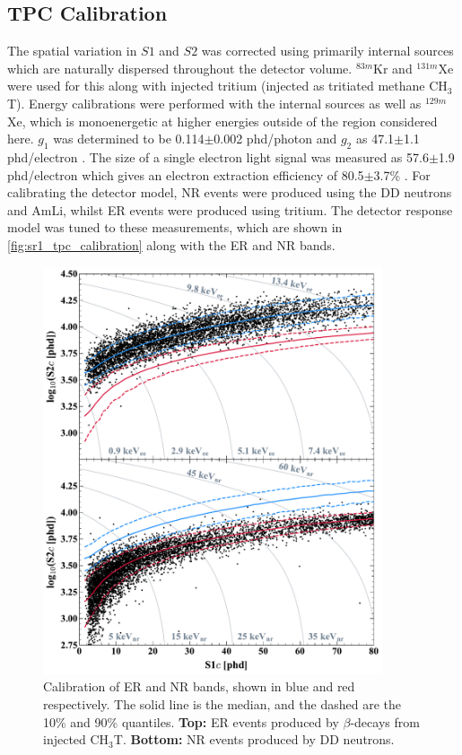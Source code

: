 \subsection{TPC Calibration}
\par
The spatial variation in $S1$ and $S2$ was corrected using primarily internal sources which are naturally dispersed throughout the detector volume.
${}^{83m}$Kr and ${}^{131m}$Xe were used for this along with injected tritium (injected as tritiated methane CH$_3$T).
Energy calibrations were performed with the internal sources as well as ${}^{129m}$Xe, which is monoenergetic at higher energies outside of the region considered here.
$g_1$ was determined to be 0.114$\pm$0.002 phd/photon and $g_2$ as 47.1$\pm$1.1 phd/electron \cite{lz_ws_sr1_ref}.
The size of a single electron light signal was measured as 57.6$\pm$1.9 phd/electron which gives an electron extraction efficiency of 80.5$\pm$3.7\% \cite{lz_ws_sr1_ref}.
For calibrating the detector model, NR events were produced using the DD neutrons and AmLi, whilst ER events were produced using tritium.
The detector response model was tuned to these measurements, which are shown in \autoref{fig:sr1_tpc_calibration} along with the ER and NR bands.
\begin{figure}
    \centering
    \includegraphics[width=10cm]{Figures/EFT/All_SR1_Plots/SR1WS_calOnly_0629_twoPanel.pdf}
    \caption{Calibration of ER and NR bands, shown in blue and red respectively.
             The solid line is the median, and the dashed are the 10\% and 90\% quantiles.
             \textbf{Top:} ER events produced by $\beta$-decays from injected CH$_3$T.
             \textbf{Bottom:} NR events produced by DD neutrons.
             }
    \label{fig:sr1_tpc_calibration}
\end{figure}

